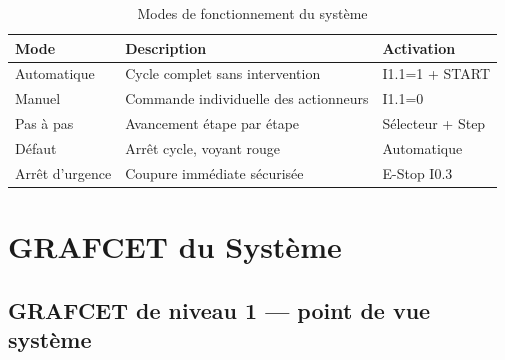 \documentclass[12pt, a4paper]{report}
\begin{document}
\begin{table}[H]
  \centering
  \caption{Modes de fonctionnement du syst\`eme}
  \begin{tabular}{L{3.5cm} L{5.5cm} L{4cm}}
    \toprule
    \color{white}\textbf{Mode} &
    \color{white}\textbf{Description} &
    \color{white}\textbf{Activation} \\
    \midrule
    Automatique       & Cycle complet sans intervention & I1.1=1 + START \\
    Manuel            & Commande individuelle des actionneurs & I1.1=0 \\
    Pas \`a pas       & Avancement \'etape par \'etape & S\'electeur + Step \\
    D\'efaut          & Arr\^et cycle, voyant rouge & Automatique \\
    Arr\^et d'urgence & Coupure imm\'ediate s\'ecuris\'ee & E-Stop I0.3 \\
    \bottomrule
  \end{tabular}
\end{table}

\chapter{GRAFCET du Syst\`eme}
\label{chap:grafcet}

\section{GRAFCET de niveau 1 --- point de vue syst\`eme}
\end{document}
